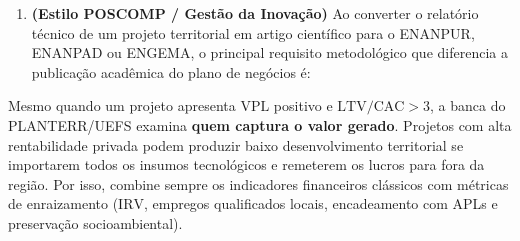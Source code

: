 \begin{enumerate}[leftmargin=1.5em, itemsep=5pt]
  \item \textbf{(Estilo POSCOMP / Gestão da Inovação)} Ao converter o relatório técnico de um projeto territorial em artigo científico para o ENANPUR, ENANPAD ou ENGEMA, o principal requisito metodológico que diferencia a publicação acadêmica do plano de negócios é:
\end{enumerate}

\begin{boxDica}
Mesmo quando um projeto apresenta $\text{VPL}$ positivo e $\text{LTV/CAC} > 3$, a banca do PLANTERR/UEFS examina \textbf{quem captura o valor gerado}. Projetos com alta rentabilidade privada podem produzir baixo desenvolvimento territorial se importarem todos os insumos tecnológicos e remeterem os lucros para fora da região. Por isso, combine sempre os indicadores financeiros clássicos com métricas de enraizamento ($\text{IRV}$, empregos qualificados locais, encadeamento com APLs e preservação socioambiental).
\end{boxDica}

\clearpage
{}

